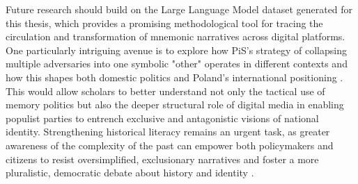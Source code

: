 Future research should build on the Large Language Model dataset generated for this thesis, which provides a promising methodological tool for tracing the circulation and transformation of mnemonic narratives across digital platforms. One particularly intriguing avenue is to explore how PiS’s strategy of collapsing multiple adversaries into one symbolic "other" operates in different contexts and how this shapes both domestic politics and Poland’s international positioning \citep{rybicki_2025_16933320}. This would allow scholars to better understand not only the tactical use of memory politics but also the deeper structural role of digital media in enabling populist parties to entrench exclusive and antagonistic visions of national identity. Strengthening historical literacy remains an urgent task, as greater awareness of the complexity of the past can empower both policymakers and citizens to resist oversimplified, exclusionary narratives and foster a more pluralistic, democratic debate about history and identity \citep{mumford_parallels_2015}.
 